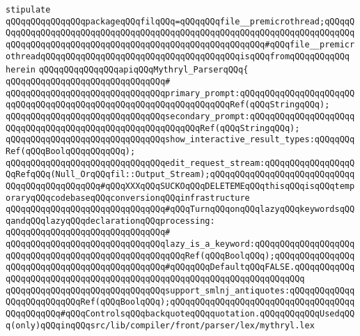 \newline
\newline
\verb|stipulate|\newline
\verb|qQQqqQQqqQQqqQQqpackageqQQqfilqQQq=qQQqqQQqfile__premicrothread;qQQqqQQqqQQqqQQqqQQqqQQqqQQqqQQqqQQqqQQqqQQqqQQqqQQqqQQqqQQqqQQqqQQqqQQqqQQqqQQqqQQqqQQqqQQqqQQqqQQqqQQqqQQqqQQqqQQqqQQqqQQqqQQq#qQQqfile__premicrothreadqQQqqQQqqQQqqQQqqQQqqQQqqQQqqQQqqQQqqQQqisqQQqfromqQQqqQQqqQQq|\newline
\verb|herein|\newline
\newline
\verb|qQQqqQQqqQQqqQQqapiqQQqMythryl_ParserqQQq{|\newline
\verb|qQQqqQQqqQQqqQQqqQQqqQQqqQQqqQQq#|\newline
\verb|qQQqqQQqqQQqqQQqqQQqqQQqqQQqqQQqprimary_prompt:qQQqqQQqqQQqqQQqqQQqqQQqqQQqqQQqqQQqqQQqqQQqqQQqqQQqqQQqqQQqqQQqqQQqRef(qQQqStringqQQq);|\newline
\verb|qQQqqQQqqQQqqQQqqQQqqQQqqQQqqQQqsecondary_prompt:qQQqqQQqqQQqqQQqqQQqqQQqqQQqqQQqqQQqqQQqqQQqqQQqqQQqqQQqqQQqRef(qQQqStringqQQq);|\newline
\verb|qQQqqQQqqQQqqQQqqQQqqQQqqQQqqQQqshow_interactive_result_types:qQQqqQQqRef(qQQqBoolqQQqqQQqqQQq);|\newline
\newline
\verb|qQQqqQQqqQQqqQQqqQQqqQQqqQQqqQQqedit_request_stream:qQQqqQQqqQQqqQQqqQQqRefqQQq(Null_OrqQQqfil::Output_Stream);qQQqqQQqqQQqqQQqqQQqqQQqqQQqqQQqqQQqqQQqqQQqqQQq#qQQqXXXqQQqSUCKOqQQqDELETEMEqQQqthisqQQqisqQQqtemporaryqQQqcodebaseqQQqconversionqQQqinfrastructure|\newline
\newline
\newline
\verb|qQQqqQQqqQQqqQQqqQQqqQQqqQQqqQQq#qQQqTurnqQQqonqQQqlazyqQQqkeywordsqQQqandqQQqlazyqQQqdeclarationqQQqprocessing:|\newline
\verb|qQQqqQQqqQQqqQQqqQQqqQQqqQQqqQQq#|\newline
\verb|qQQqqQQqqQQqqQQqqQQqqQQqqQQqqQQqlazy_is_a_keyword:qQQqqQQqqQQqqQQqqQQqqQQqqQQqqQQqqQQqqQQqqQQqqQQqqQQqqQQqRef(qQQqBoolqQQq);qQQqqQQqqQQqqQQqqQQqqQQqqQQqqQQqqQQqqQQqqQQqqQQq#qQQqqQQqDefaultqQQqFALSE.qQQqqQQqqQQqqQQqqQQqqQQqqQQqqQQqqQQqqQQqqQQqqQQqqQQqqQQqqQQqqQQqqQQqqQQq|\newline
\newline
\verb|qQQqqQQqqQQqqQQqqQQqqQQqqQQqqQQqsupport_smlnj_antiquotes:qQQqqQQqqQQqqQQqqQQqqQQqqQQqRef(qQQqBoolqQQq);qQQqqQQqqQQqqQQqqQQqqQQqqQQqqQQqqQQqqQQqqQQqqQQq#qQQqControlsqQQqbackquoteqQQqquotation.qQQqqQQqqQQqUsedqQQq(only)qQQqinqQQqsrc/lib/compiler/front/parser/lex/mythryl.lex|\newline
